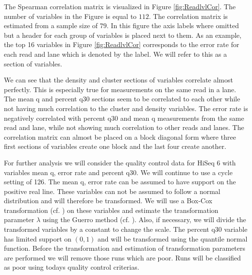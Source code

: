 \documentclass[a4paper,11pt,fleqn,twoside,notitlepage]{report}\usepackage[]{graphicx}\usepackage[]{color}
\begin{document}
The Spearman correlation matrix is visualized in Figure \ref{fig:ReadlvlCor}. The number of variables in the Figure is equal to $112$. The correlation matrix is estimated from a sample size of $79$. In this figure the axis labels where omitted but a header for each group of variables is placed next to them. As an example, the top 16 variables in Figure \ref{fig:ReadlvlCor} corresponds to the error rate for each read and lane which is denoted by the label. We will refer to this as a section of variables. 

We can see that the density and cluster sections of variables correlate almost perfectly. This is especially true for measurements on the same read in a lane. The mean q and percent q30 sections seem to be correlated to each other while not having much correlation to the cluster and density variables. The error rate is negatively correlated with percent q30 and mean q measurements from the same read and lane, while not showing much correlation to other reads and lanes. The correlation matrix can almost be placed on a block diagonal form where three first sections of variables create one block and the last four create another. %

For further analysis we will consider the quality control data for HiSeq 6 with variables mean q, error rate and percent q30. We will continue to use a cycle setting of 126. The mean q, error rate can be assumed to have support on the positive real line. These variables can not be assumed to follow a normal distribution and will therefore be transformed. We will use a Box-Cox transformation (cf. \citet{BoxCox}) on these variables and estimate the transformation parameter $\lambda$ using the Guerro method (cf. \citet{Gurrero}). Also, if necessary, we will divide the transformed variables by a constant to change the scale. The percent q30 variable has limited support on $(0,1)$ and will be transformed using the quantile normal function. Before the transformation and estimation of transformation parameters are performed we will remove those runs which are poor. Runs will be classified as poor using todays quality control criterias. 
\end{document}
